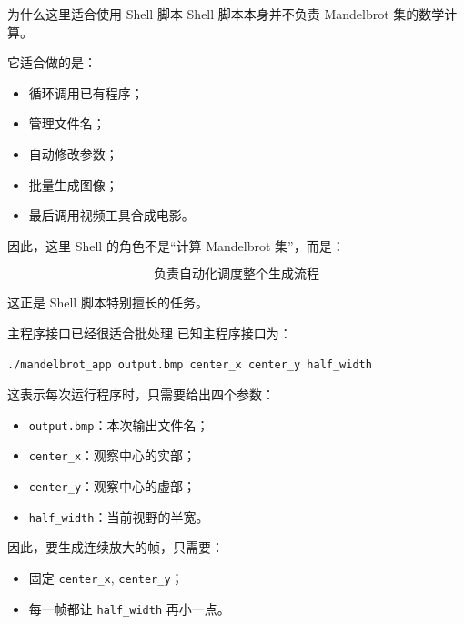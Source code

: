 \documentclass[aspectratio=169,11pt]{ctexbeamer}
\begin{document}
\begin{frame}{为什么这里适合使用 Shell 脚本}
Shell 脚本本身并不负责 Mandelbrot 集的数学计算。

\vspace{0.5em}
它适合做的是：

\begin{itemize}
  \item 循环调用已有程序；
  \item 管理文件名；
  \item 自动修改参数；
  \item 批量生成图像；
  \item 最后调用视频工具合成电影。
\end{itemize}

\vspace{0.5em}
因此，这里 Shell 的角色不是“计算 Mandelbrot 集”，而是：

\[
\boxed{\text{负责自动化调度整个生成流程}}
\]

\vspace{0.5em}
这正是 Shell 脚本特别擅长的任务。
\end{frame}

\begin{frame}[fragile]{主程序接口已经很适合批处理}
已知主程序接口为：

\begin{lstlisting}[language=bash]
./mandelbrot_app output.bmp center_x center_y half_width
\end{lstlisting}

\vspace{0.5em}
这表示每次运行程序时，只需要给出四个参数：

\begin{itemize}
  \item \texttt{output.bmp}：本次输出文件名；
  \item \texttt{center\_x}：观察中心的实部；
  \item \texttt{center\_y}：观察中心的虚部；
  \item \texttt{half\_width}：当前视野的半宽。
\end{itemize}

\vspace{0.5em}
因此，要生成连续放大的帧，只需要：

\begin{itemize}
  \item 固定 \texttt{center\_x}, \texttt{center\_y}；
  \item 每一帧都让 \texttt{half\_width} 再小一点。
\end{itemize}
\end{frame}
\end{document}
